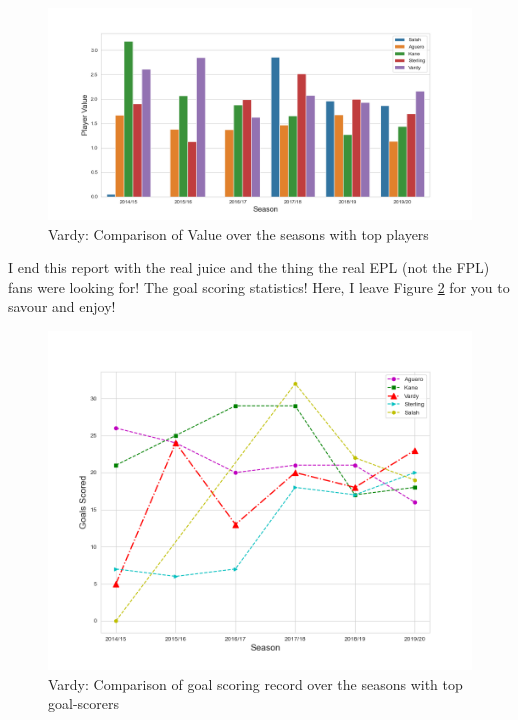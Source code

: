 \documentclass{article}
\begin{document}
\begin{figure}[H]
    \centering
    \includegraphics[width=1\linewidth]{assets/value_season_all.png}
    \caption{Vardy: Comparison of Value over the seasons with top players}
    \label{fig:value_season_all}
\end{figure}

I end this report with the real juice and the thing the real EPL (not the FPL) fans were looking for! The goal scoring statistics! Here, I leave Figure \ref{fig:goal_season_all} for you to savour and enjoy!

\begin{figure}[H]
    \centering
    \includegraphics[width=0.95\linewidth]{assets/goal_season_all.png}
    \caption{Vardy: Comparison of goal scoring record over the seasons with top goal-scorers}
    \label{fig:goal_season_all}
\end{figure}
\end{document}
